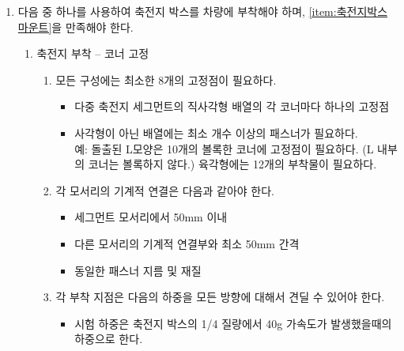 \documentclass[final,a4paper,10pt]{report}
\begin{document}
\begin{enumerate}
  \item\label{rule:formula-technical.accumulator-container-mechanical.attachment} 다음 중 하나를 사용하여 축전지 박스를 차량에 부착해야 하며, \ref{item:축전지박스 마운트}을 만족해야 한다. \label{item:축전지박스 하중}
    \begin{enumerate}
      \item\label{rule:formula-technical.accumulator-container-mechanical.attachment.corner-fixing} 축전지 부착 – 코너 고정
        \begin{enumerate}
          \item\label{rule:formula-technical.accumulator-container-mechanical.attachment.corner-fixing.min-eight-points} 모든 구성에는 최소한 8개의 고정점이 필요하다.
            \begin{itemize}
              \item 다중 축전지 세그먼트의 직사각형 배열의 각 코너마다 하나의 고정점
              \item 사각형이 아닌 배열에는 최소 개수 이상의 패스너가 필요하다.\\
                예: 돌출된 L모양은 10개의 볼록한 코너에 고정점이 필요하다. (L 내부의 코너는 볼록하지 않다.) 육각형에는 12개의 부착물이 필요하다.
            \end{itemize}

          \item\label{rule:formula-technical.accumulator-container-mechanical.attachment.corner-fixing.connection-spacing} 각 모서리의 기계적 연결은 다음과 같아야 한다.
            \begin{itemize}
              \item 세그먼트 모서리에서 50mm 이내
              \item 다른 모서리의 기계적 연결부와 최소 50mm 간격
              \item 동일한 패스너 지름 및 재질
            \end{itemize}

          \item\label{rule:formula-technical.accumulator-container-mechanical.attachment.corner-fixing.test-load-40g} 각 부착 지점은 다음의 하중을 모든 방향에 대해서 견딜 수 있어야 한다.
            \begin{itemize}
              \item 시험 하중은 축전지 박스의 1/4 질량에서 40g 가속도가 발생했을때의 하중으로 한다.
            \end{itemize}
        \end{enumerate}


\end{enumerate}
\end{enumerate}
\end{document}
